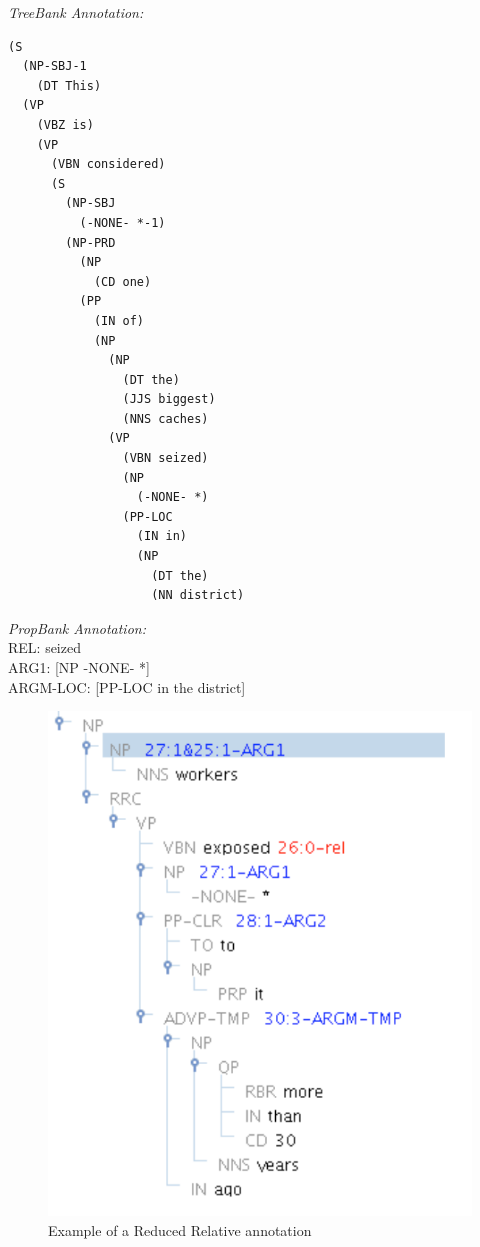 \documentclass[11pt]{report}
\begin{document}
\textit{TreeBank Annotation:}
\begin{verbatim}
(S
  (NP-SBJ-1
    (DT This)
  (VP
    (VBZ is)
    (VP
      (VBN considered)
      (S
        (NP-SBJ
          (-NONE- *-1)
        (NP-PRD
          (NP
            (CD one)
          (PP
            (IN of)
            (NP
              (NP
                (DT the)
                (JJS biggest)
                (NNS caches)
              (VP
                (VBN seized)
                (NP
                  (-NONE- *)
                (PP-LOC
                  (IN in)
                  (NP
                    (DT the)
                    (NN district)
\end{verbatim}
                    
\textit{PropBank Annotation:}\\
REL: seized\\
ARG1: [NP -NONE- *] \\
ARGM-LOC: [PP-LOC in the district]

\begin{figure}[htbp]
\centering
\includegraphics[scale=0.4]{img/redrelex.png}
\caption{Example of a Reduced Relative annotation}
\label{fig: redrelex}
\end{figure}
\end{document}

